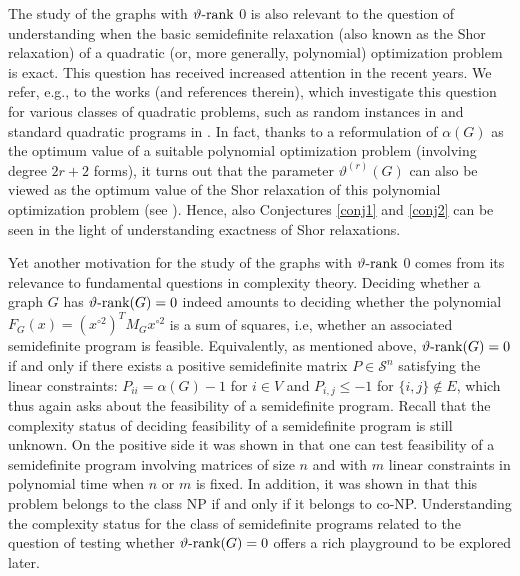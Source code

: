\documentclass[11pt]{article}
\numberwithin{equation}{section}
\newcommand{\rrank}{\vartheta\text{\rm -rank}}
\begin{document}
The study of the graphs with  $\rrank$ 0 is also relevant to the question of understanding when the basic semidefinite relaxation (also known as the Shor relaxation) of  a quadratic (or, more generally, polynomial) optimization problem is exact. This question has received increased attention in the recent years. We refer, e.g., to the works \cite{BY2020,GY2021,WK2021} (and references therein), which investigate this question for various classes of quadratic problems, such as random instances in \cite{BY2020} and standard quadratic programs in \cite{GY2021}.
In fact, thanks to a reformulation of $\alpha(G)$  as the optimum value of a suitable  polynomial optimization problem (involving degree $2r+2$ forms), it turns out that the parameter $\vartheta^{(r)}(G)$ can also be viewed as the optimum value of the Shor relaxation of this polynomial optimization problem (see \cite[Section 6.3]{GL2007}). Hence, also Conjectures \ref{conj1} and  \ref{conj2} can be seen in the light of understanding exactness of  Shor relaxations.
 
Yet another  motivation for the study of the graphs with $\rrank$ 0 comes from its relevance to fundamental questions in complexity theory.
Deciding whether a graph $G$ has $\rrank(G)=0$  indeed amounts to deciding whether the polynomial $F_G(x)=(x^{\circ2})^TM_Gx^{\circ2}$ is a sum of squares, i.e, whether  an associated  semidefinite program is feasible. Equivalently, as mentioned above, $\rrank(G)=0$ if and only if  there exists a positive semidefinite matrix $P\in \mathcal S^n$ satisfying the linear constraints: $P_{ii}=\alpha(G)-1$ for $i\in V$ %
and $P_{i,j}\leq -1$ for $\{i,j\}\notin E$, which thus again asks about the feasibility of a semidefinite program. Recall that  the complexity status of deciding feasibility of a semidefinite program is still unknown. On the positive side it was shown in \cite{PorkolabKhachiyan} that one can test feasibility of a semidefinite program involving matrices of size $n$ and with $m$ linear constraints  in polynomial time when $n$ or $m$ is fixed.
In addition,   it was shown in \cite{Ramana} that this problem  belongs to the class NP if and only if it belongs to co-NP.  Understanding the complexity status for the class of semidefinite programs related to the question of testing whether $\rrank(G)=0$ offers a rich playground to be explored later. 
 
\end{document}
